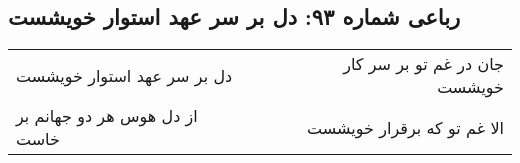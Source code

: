 \begin{center}
\section*{رباعی شماره ۹۳: دل بر سر عهد استوار خویشست}
\label{sec:sh093}
\begin{longtable}{l p{0.5cm} r}
دل بر سر عهد استوار خویشست
&&
جان در غم تو بر سر کار خویشست
\\
از دل هوس هر دو جهانم بر خاست
&&
الا غم تو که برقرار خویشست
\\
\end{longtable}
\end{center}
